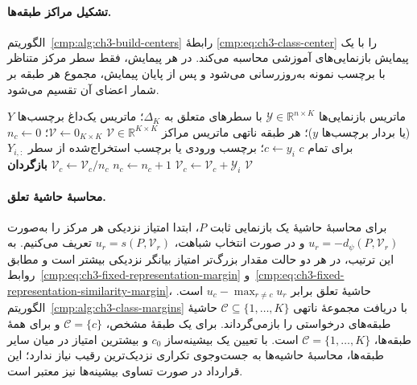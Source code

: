 \paragraph{تشکیل مراکز طبقه‌ها.}
الگوریتم~\ref{cmp:alg:ch3-build-centers} رابطهٔ
\eqref{cmp:eq:ch3-class-center} را با یک پیمایش
بازنمایی‌های آموزشی محاسبه می‌کند. در هر پیمایش،
فقط سطر مرکز متناظر با برچسب نمونه به‌روزرسانی
می‌شود و پس از پایان پیمایش، مجموع هر طبقه بر
شمار اعضای آن تقسیم می‌شود.

\begin{algorithm}[!htbp]
\caption{زیرروال $\operatorname{BuildCenters}$: تشکیل مراکز طبقه‌ها}
\label{cmp:alg:ch3-build-centers}
\begin{algorithmic}[1]
\REQUIRE ماتریس بازنمایی‌ها $\mathscr Y\in\mathbb R^{n\times K}$ با سطرهای متعلق به $\Delta_K$؛
ماتریس یک‌داغ برچسب‌ها $Y$ (یا بردار برچسب‌ها $y$)؛ هر طبقه ناتهی
\ENSURE ماتریس مراکز $\mathcal V\in\mathbb R^{K\times K}$
\STATE $\mathcal V\gets0_{K\times K}$؛ $n_c\gets0$ برای تمام $c$
    \STATE $c\gets y_i$؛ برچسب ورودی یا برچسب استخراج‌شده از سطر $Y_{i,:}$
    \STATE $\mathcal V_c\gets\mathcal V_c+\mathscr Y_i$
    \STATE $n_c\gets n_c+1$
\ENDFOR
{}
    \STATE $\mathcal V_c\gets\mathcal V_c/n_c$
\ENDFOR
\STATE \textbf{بازگردان} $\mathcal V$
\end{algorithmic}
\end{algorithm}

\paragraph{محاسبهٔ حاشیهٔ تعلق.}
برای محاسبهٔ حاشیهٔ یک بازنمایی ثابت $P$، ابتدا
امتیاز نزدیکی هر مرکز را به‌صورت $u_r=-d_\psi(P,\mathcal V_r)$
و در صورت انتخاب شباهت، $u_r=s(P,\mathcal V_r)$
تعریف می‌کنیم. به این ترتیب، در هر دو حالت مقدار
بزرگ‌تر امتیاز بیانگر نزدیکی بیشتر است و مطابق
روابط~\eqref{cmp:eq:ch3-fixed-representation-margin}
و~\eqref{cmp:eq:ch3-fixed-representation-similarity-margin}،
حاشیهٔ تعلق برابر $u_c-\max_{r\ne c}u_r$ است.
الگوریتم~\ref{cmp:alg:ch3-class-margins} با دریافت
مجموعهٔ ناتهی $\mathcal C\subseteq\{1,\ldots,K\}$
حاشیهٔ طبقه‌های درخواستی را بازمی‌گرداند.
برای یک طبقهٔ مشخص، $\mathcal C=\{c\}$ و برای
همهٔ طبقه‌ها، $\mathcal C=\{1,\ldots,K\}$ است.
با تعیین یک بیشینه‌ساز $c_0$ و بیشترین امتیاز
در میان سایر طبقه‌ها، محاسبهٔ حاشیه‌ها به جست‌وجوی
تکراری نزدیک‌ترین رقیب نیاز ندارد؛ این قرارداد
در صورت تساوی بیشینه‌ها نیز معتبر است.

